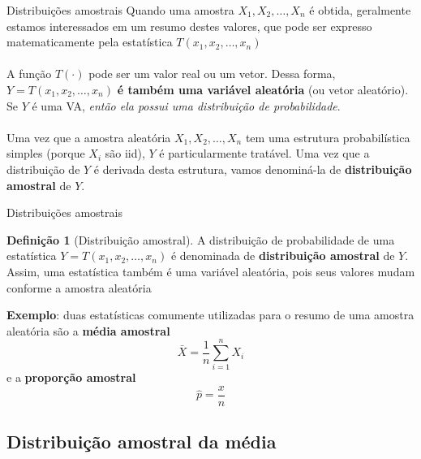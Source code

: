 \documentclass[10pt]{beamer}\usepackage[]{graphicx}\usepackage[]{color}
\theoremstyle{definition}
\newtheorem*{mydef}{Definição}
\begin{document}
\begin{frame}[fragile=singleslide]{Distribuições amostrais}
  Quando uma amostra $X_1, X_2, \ldots, X_n$ é obtida, geralmente
  estamos interessados em um resumo destes valores, que pode ser
  expresso matematicamente pela estatística $T(x_1, x_2, \ldots, x_n)$
  \\~\\
  A função $T(\cdot)$ pode ser um valor real ou um vetor. Dessa forma,
  $Y = T(x_1, x_2, \ldots, x_n)$ \textbf{é também uma variável
    aleatória} (ou vetor aleatório). Se $Y$ é uma VA, \emph{então ela possui
  uma distribuição de probabilidade}. \\~\\
  Uma vez que a amostra aleatória $X_1, X_2, \ldots, X_n$ tem uma
  estrutura probabilística simples (porque $X_i$ são iid), $Y$ é
  particularmente tratável. Uma vez que a distribuição de $Y$ é derivada
  desta estrutura, vamos denominá-la de \textbf{distribuição amostral}
  de $Y$.
\end{frame}

\begin{frame}[fragile=singleslide]{Distribuições amostrais}
  \begin{mydef}[Distribuição amostral]
    A distribuição de probabilidade de uma estatística $Y = T(x_1, x_2,
    \ldots, x_n)$ é denominada de \textbf{distribuição amostral} de
    $Y$. Assim, uma estatística também é uma variável aleatória, pois
    seus valores mudam conforme a amostra aleatória
  \end{mydef}
  \vspace{1em}
    \textbf{Exemplo}: duas estatísticas comumente utilizadas para o
    resumo de uma amostra aleatória são a \textbf{média amostral}
\begin{equation*}
  \bar{X} = \frac{1}{n} \sum_{i=1}^{n} X_i
\end{equation*}
e a \textbf{proporção amostral}
\begin{equation*}
  \hat{p} = \frac{x}{n}
\end{equation*}
\end{frame}

\subsection{Distribuição amostral da média}
\end{document}
